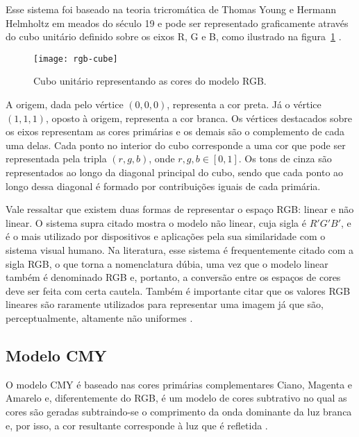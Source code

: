 Esse sistema foi baseado na teoria tricromática de Thomas Young e Hermann Helmholtz em meados do século 19 e pode ser representado graficamente
através do cubo unitário definido sobre os eixos R, G e B, como ilustrado na figura~\ref{fig:rgb-cube} \citep{konstantinos:00}.

\begin{figure}[!h]
  \centering
  \texttt{[image: rgb-cube]}
  \caption{Cubo unitário representando as cores do modelo RGB.}
  \label{fig:rgb-cube} 
\end{figure}

A origem, dada pelo vértice $(0, 0, 0)$, representa a cor preta. Já o vértice $(1, 1, 1)$, oposto à origem, representa a cor branca. Os vértices destacados sobre os eixos representam as cores primárias e os demais são o complemento de cada uma delas. Cada ponto no interior do cubo corresponde a uma cor que pode ser representada pela tripla $(r, g, b)$, onde $r, g, b \in [0, 1]$. Os tons de cinza são representados ao longo da diagonal principal do cubo, sendo que cada ponto ao longo dessa diagonal é formado por contribuições iguais de cada primária.

Vale ressaltar que existem duas formas de representar o espaço RGB: linear e não linear. O sistema supra citado mostra o modelo não linear, cuja sigla é $R'G'B'$, e é o mais utilizado por dispositivos e aplicações pela sua similaridade com o sistema visual humano. Na literatura, esse sistema é frequentemente citado com a sigla RGB, o que torna a nomenclatura dúbia, uma vez que o modelo linear também é denominado RGB e, portanto, a conversão entre os espaços de cores deve ser feita com certa cautela. Também é importante citar que os valores RGB lineares são raramente utilizados para representar uma imagem já que são, perceptualmente, altamente não uniformes \citep{konstantinos:00}.


\subsection{Modelo CMY}
\label{sec:modelo_cores_cmy}

O modelo CMY é baseado nas cores primárias complementares Ciano, Magenta e Amarelo e, diferentemente do RGB, é um modelo de cores subtrativo no qual as cores são geradas subtraindo-se o comprimento da onda dominante da luz branca e, por isso, a cor resultante corresponde à luz que é refletida \citep{gonzalez:02}.

